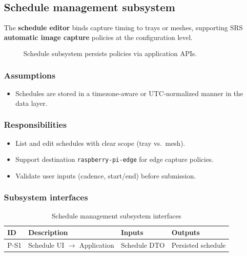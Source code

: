 \subsection{Schedule management subsystem}

The \textbf{schedule editor} binds capture timing to trays or meshes, supporting SRS \textbf{automatic image capture} policies at the configuration level.

\begin{figure}[H]
\centering
{}
\caption{Schedule subsystem persists policies via application APIs.}
\label{fig:pres-sch}
\end{figure}

\subsubsection{Assumptions}
\begin{itemize}
  \item Schedules are stored in a timezone-aware or UTC-normalized manner in the data layer.
\end{itemize}

\subsubsection{Responsibilities}
\begin{itemize}
  \item List and edit schedules with clear scope (tray vs.\ mesh).
  \item Support destination \texttt{raspberry-pi-edge} for edge capture policies.
  \item Validate user inputs (cadence, start/end) before submission.
\end{itemize}

\subsubsection{Subsystem interfaces}
\begin{table}[H]
\centering
\small
\begin{tabular}{|p{0.9cm}|p{3.4cm}|p{3.0cm}|p{3.5cm}|}
\hline
\textbf{ID} & \textbf{Description} & \textbf{Inputs} & \textbf{Outputs} \\
\hline
P-S1 & Schedule UI $\rightarrow$ Application & Schedule DTO & Persisted schedule \\
\hline
\end{tabular}
\caption{Schedule management subsystem interfaces}
\end{table}

